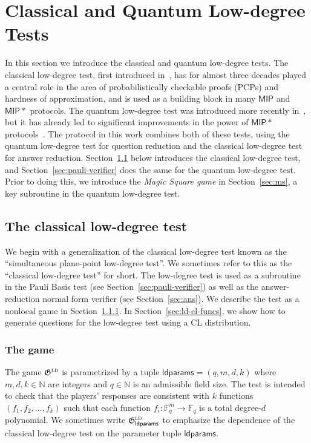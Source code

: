 \documentclass[11pt]{article}
\theoremstyle{definition}
\newcommand{\N}{\ensuremath{\mathbb{N}}}
\newcommand{\F}{\ensuremath{\mathbb{F}}}
\newcommand{\ld}{\textsc{ld}}
\newcommand{\game}{\mathfrak{G}}
\newcommand{\ldc}{k} %
\newcommand{\class}[1]{\ensuremath{\mathsf{#1}}\xspace}
\newcommand{\MIP}{\class{MIP}} %
\newcommand{\ldparams}{\mathsf{ldparams}}
\begin{document}
\section{Classical and Quantum Low-degree Tests}
\label{sec:ldt}

In this section we introduce the classical and quantum low-degree tests.
The classical low-degree test, first introduced
in~\cite{babai1991non,arora1998probabilistic}, has for almost three decades
played a central role in the area of probabilistically checkable proofs (PCPs)
and hardness of approximation, and is used as a building block in many $\MIP$
and $\MIP*$ protocols.
The quantum low-degree test was introduced more recently
in~\cite{natarajan2018low}, but it has already led to significant improvements
in the power of $\MIP*$ protocols~\cite{natarajan2018low,NW19}.
The protocol in this work combines both of these tests, using the quantum
low-degree test for question reduction and the classical low-degree test for
answer reduction.
Section~\ref{sec:ld-verifier} below introduces the classical low-degree test,
and Section~\ref{sec:pauli-verifier} does the same for the quantum low-degree
test.
Prior to doing this, we introduce the \emph{Magic Square game} in
Section~\ref{sec:ms}, a key subroutine in the quantum low-degree test.


\subsection{The classical low-degree test}
\label{sec:ld-verifier}

We begin with a generalization of the classical low-degree test known as the
``simultaneous plane-point low-degree test''.
We sometimes refer to this as the ``classical low-degree test'' for short.
The low-degree test is used as a subroutine in the Pauli Basis test (see
Section~\ref{sec:pauli-verifier}) as well as the answer-reduction normal form
verifier (see Section~\ref{sec:ans}).
We describe the test as a nonlocal game in Section~\ref{sec:ld-game}.
In Section~\ref{sec:ld-cl-funcs}, we show how to generate questions for the
low-degree test using a CL distribution.


\subsubsection{The game}
\label{sec:ld-game}

The game $\game^\ld$ is parametrized by a tuple $\ldparams = (q, m, d, \ldc)$
where $m, d, \ldc \in \N$ are integers and $q \in \N$ is an admissible field
size.
The test is intended to check that the players' responses are consistent with
$\ldc$ functions $(f_1, f_2, \ldots, f_\ldc)$ such that each function $f_i:
\F_q^m \to \F_q$ is a total degree-$d$ polynomial.
We sometimes write $\game^\ld_\ldparams$ to emphasize the dependence of the
classical low-degree test on the parameter tuple $\ldparams$.
\end{document}
